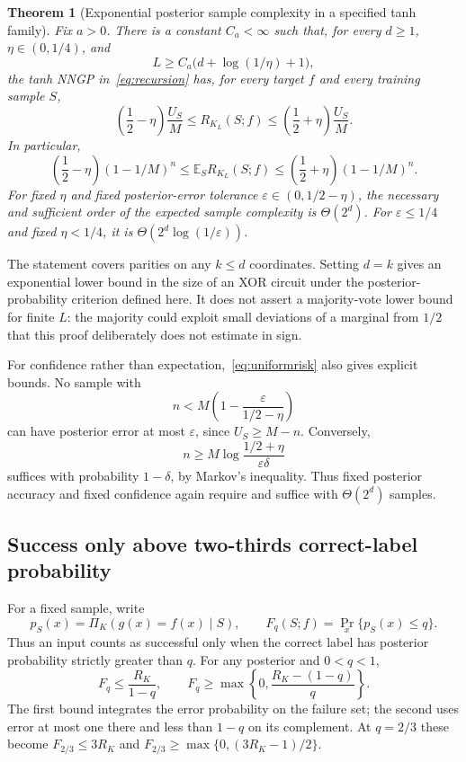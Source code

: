 \documentclass[11pt]{article}
\newtheorem{theorem}{Theorem}[section]
\theoremstyle{remark}\newtheorem{remark}[theorem]{Remark}
\newcommand{\E}{\mathbb E}
\begin{document}
\begin{theorem}[Exponential posterior sample complexity in a specified tanh family]\label{thm:tanh}
Fix $a>0$. There is a constant $C_a<\infty$ such that, for every $d\ge1$, $\eta\in(0,1/4)$, and
\begin{equation}\label{eq:depth}
 L\ge C_a\bigl(d+\log(1/\eta)+1\bigr),
\end{equation}
the tanh NNGP in~\eqref{eq:recursion} has, for every target $f$ and every training sample $S$,
\begin{equation}\label{eq:uniformrisk}
 \left(\frac12-\eta\right)\frac{U_S}{M}
 \le R_{K_L}(S;f)\le
 \left(\frac12+\eta\right)\frac{U_S}{M}.
\end{equation}
In particular,
\begin{equation}\label{eq:expectedrisk}
 \left(\frac12-\eta\right)(1-1/M)^n
 \le\E_S R_{K_L}(S;f)\le
 \left(\frac12+\eta\right)(1-1/M)^n.
\end{equation}
For fixed $\eta$ and fixed posterior-error tolerance $\varepsilon\in(0,1/2-\eta)$, the necessary and sufficient order of the expected sample complexity is $\Theta(2^d)$. For $\varepsilon\le1/4$ and fixed $\eta<1/4$, it is $\Theta(2^d\log(1/\varepsilon))$.
\end{theorem}
The statement covers parities on any $k\le d$ coordinates. Setting $d=k$ gives an exponential lower bound in the size of an XOR circuit under the posterior-probability criterion defined here. It does not assert a majority-vote lower bound for finite $L$: the majority could exploit small deviations of a marginal from $1/2$ that this proof deliberately does not estimate in sign.

For confidence rather than expectation,~\eqref{eq:uniformrisk} also gives explicit bounds. No sample with
\[
 n<M\left(1-\frac{\varepsilon}{1/2-\eta}\right)
\]
can have posterior error at most $\varepsilon$, since $U_S\ge M-n$. Conversely,
\[
 n\ge M\log\frac{1/2+\eta}{\varepsilon\delta}
\]
suffices with probability $1-\delta$, by Markov's inequality. Thus fixed posterior accuracy and fixed confidence again require and suffice with $\Theta(2^d)$ samples.

\subsection{Success only above two-thirds correct-label probability}
For a fixed sample, write
\[
 p_S(x)=\Pi_K(g(x)=f(x)\mid S),\qquad
 F_q(S;f)=\Pr_x\{p_S(x)\leq q\}.
\]
Thus an input counts as successful only when the correct label has posterior
probability strictly greater than $q$. For any posterior and $0<q<1$,
\[
 F_q\leq\frac{R_K}{1-q},\qquad
 F_q\geq\max\left\{0,\frac{R_K-(1-q)}q\right\}.
\]
The first bound integrates the error probability on the failure set; the
second uses error at most one there and less than $1-q$ on its complement.
At $q=2/3$ these become $F_{2/3}\leq3R_K$ and
$F_{2/3}\geq\max\{0,(3R_K-1)/2\}$.
\end{document}
